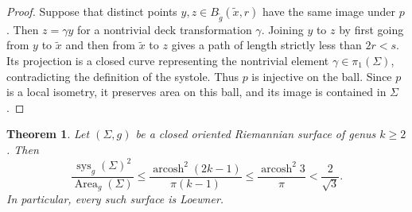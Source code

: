 \documentclass[11pt]{amsart}
\newtheorem{theorem}{Theorem}
\theoremstyle{remark}
\DeclareMathOperator{\Area}{Area}
\DeclareMathOperator{\sys}{sys}
\DeclareMathOperator{\arcosh}{arcosh}
\begin{document}
\begin{proof}
Suppose that distinct points $y,z\in B_{\widetilde g}(\widetilde x,r)$ have the same image under $p$. Then $z=\gamma y$ for a nontrivial deck transformation $\gamma$. Joining $y$ to $z$ by first going from $y$ to $\widetilde x$ and then from $\widetilde x$ to $z$ gives a path of length strictly less than $2r<s$. Its projection is a closed curve representing the nontrivial element $\gamma\in\pi_1(\Sigma)$, contradicting the definition of the systole. Thus $p$ is injective on the ball. Since $p$ is a local isometry, it preserves area on this ball, and its image is contained in $\Sigma$.
\end{proof}

\begin{theorem}\label{thm:strong}
Let $(\Sigma,g)$ be a closed oriented Riemannian surface of genus $k\geq2$. Then
\begin{equation}\label{eq:strong-bound}
  \frac{\sys_g(\Sigma)^2}{\Area_g(\Sigma)}
  \leq
  \frac{\arcosh^2(2k-1)}{\pi(k-1)}
  \leq
  \frac{\arcosh^2 3}{\pi}
  <\frac{2}{\sqrt3}.
\end{equation}
In particular, every such surface is Loewner.
\end{theorem}
\end{document}
